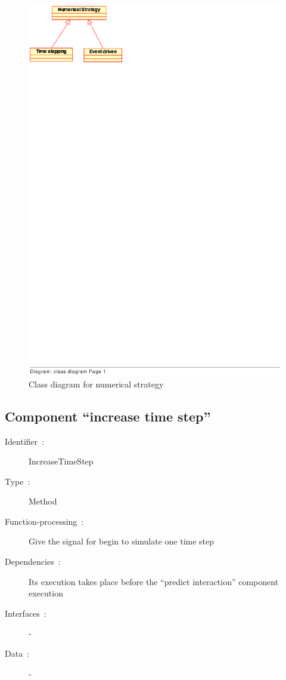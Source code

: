 	\begin{figure}
	\begin{center}
	\includegraphics[bb=25 690 245 830, clip]{figure/class_numerical_strategy.ps}
	\caption{Class diagram for numerical strategy}
	\label{fig: Class diagram for numerical strategy}
	\end{center}
	\end{figure}
	
	


  	\subsection{Component ``increase time step''}
	
		\begin{description}
	
		\item[Identifier~:]IncreaseTimeStep
		\item[Type~:]Method
		\item[Function-processing~:]Give the signal for begin to simulate one time step
		\item[Dependencies~:]Its execution takes place before the ``predict interaction'' component execution
		\item[Interfaces~:]-
		\item[Data~:]-

		\end{description}
	
